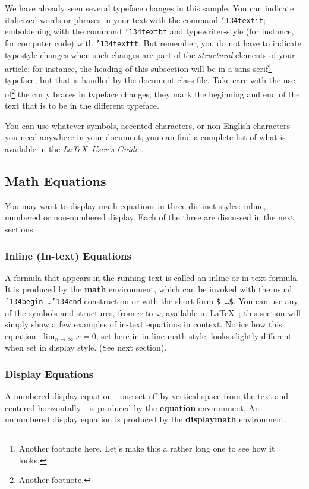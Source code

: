 We have already seen several typeface changes in this sample.  You can
indicate italicized words or phrases in your text with the command
\texttt{{\char'134}textit}; emboldening with the command
\texttt{{\char'134}textbf} and typewriter-style (for instance, for
computer code) with \texttt{{\char'134}texttt}.  But remember, you do
not have to indicate typestyle changes when such changes are part of
the \textit{structural} elements of your article; for instance, the
heading of this subsection will be in a sans serif\footnote{Another
  footnote here.  Let's make this a rather long one to see how it
  looks.} typeface, but that is handled by the document class file.
Take care with the use of\footnote{Another footnote.}  the
curly braces in typeface changes; they mark the beginning and end of
the text that is to be in the different typeface.

You can use whatever symbols, accented characters, or non-English
characters you need anywhere in your document; you can find a complete
list of what is available in the \textit{\LaTeX\ User's Guide}
\cite{Lamport:LaTeX}.

\subsection{Math Equations}
You may want to display math equations in three distinct styles:
inline, numbered or non-numbered display.  Each of
the three are discussed in the next sections.

\subsubsection{Inline (In-text) Equations}
A formula that appears in the running text is called an
inline or in-text formula.  It is produced by the
\textbf{math} environment, which can be
invoked with the usual \texttt{{\char'134}begin\,\ldots{\char'134}end}
construction or with the short form \texttt{\$\,\ldots\$}. You
can use any of the symbols and structures,
from $\alpha$ to $\omega$, available in
\LaTeX~\cite{Lamport:LaTeX}; this section will simply show a
few examples of in-text equations in context. Notice how
this equation:
\begin{math}
  \lim_{n\rightarrow \infty}x=0
\end{math},
set here in in-line math style, looks slightly different when
set in display style.  (See next section).

\subsubsection{Display Equations}
A numbered display equation---one set off by vertical space from the
text and centered horizontally---is produced by the \textbf{equation}
environment. An unnumbered display equation is produced by the
\textbf{displaymath} environment.


